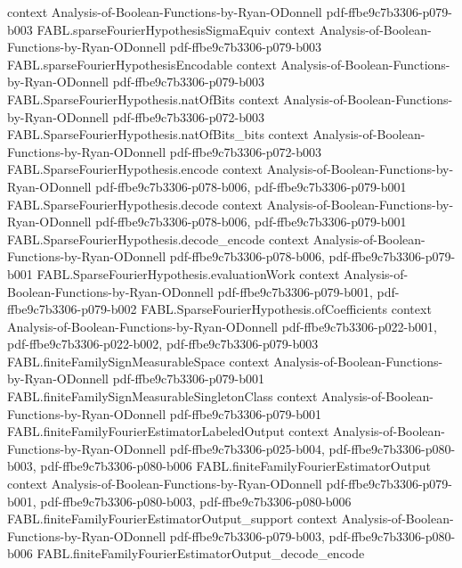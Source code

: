 \begin{theorem}
  {context}
  {Analysis-of-Boolean-Functions-by-Ryan-ODonnell}
  {pdf-ffbe9c7b3306-p079-b003}
\proofstep
  {FABL.sparseFourierHypothesisSigmaEquiv}
  {context}
  {Analysis-of-Boolean-Functions-by-Ryan-ODonnell}
  {pdf-ffbe9c7b3306-p079-b003}
\proofstep
  {FABL.sparseFourierHypothesisEncodable}
  {context}
  {Analysis-of-Boolean-Functions-by-Ryan-ODonnell}
  {pdf-ffbe9c7b3306-p079-b003}
\proofstep
  {FABL.SparseFourierHypothesis.natOfBits}
  {context}
  {Analysis-of-Boolean-Functions-by-Ryan-ODonnell}
  {pdf-ffbe9c7b3306-p072-b003}
\proofstep
  {FABL.SparseFourierHypothesis.natOfBits_bits}
  {context}
  {Analysis-of-Boolean-Functions-by-Ryan-ODonnell}
  {pdf-ffbe9c7b3306-p072-b003}
\proofstep
  {FABL.SparseFourierHypothesis.encode}
  {context}
  {Analysis-of-Boolean-Functions-by-Ryan-ODonnell}
  {pdf-ffbe9c7b3306-p078-b006,
    pdf-ffbe9c7b3306-p079-b001}
\proofstep
  {FABL.SparseFourierHypothesis.decode}
  {context}
  {Analysis-of-Boolean-Functions-by-Ryan-ODonnell}
  {pdf-ffbe9c7b3306-p078-b006,
    pdf-ffbe9c7b3306-p079-b001}
\proofstep
  {FABL.SparseFourierHypothesis.decode_encode}
  {context}
  {Analysis-of-Boolean-Functions-by-Ryan-ODonnell}
  {pdf-ffbe9c7b3306-p078-b006,
    pdf-ffbe9c7b3306-p079-b001}
\proofstep
  {FABL.SparseFourierHypothesis.evaluationWork}
  {context}
  {Analysis-of-Boolean-Functions-by-Ryan-ODonnell}
  {pdf-ffbe9c7b3306-p079-b001,
    pdf-ffbe9c7b3306-p079-b002}
\proofstep
  {FABL.SparseFourierHypothesis.ofCoefficients}
  {context}
  {Analysis-of-Boolean-Functions-by-Ryan-ODonnell}
  {pdf-ffbe9c7b3306-p022-b001,
    pdf-ffbe9c7b3306-p022-b002,
    pdf-ffbe9c7b3306-p079-b003}
\proofstep
  {FABL.finiteFamilySignMeasurableSpace}
  {context}
  {Analysis-of-Boolean-Functions-by-Ryan-ODonnell}
  {pdf-ffbe9c7b3306-p079-b001}
\proofstep
  {FABL.finiteFamilySignMeasurableSingletonClass}
  {context}
  {Analysis-of-Boolean-Functions-by-Ryan-ODonnell}
  {pdf-ffbe9c7b3306-p079-b001}
\proofstep
  {FABL.finiteFamilyFourierEstimatorLabeledOutput}
  {context}
  {Analysis-of-Boolean-Functions-by-Ryan-ODonnell}
  {pdf-ffbe9c7b3306-p025-b004,
    pdf-ffbe9c7b3306-p080-b003,
    pdf-ffbe9c7b3306-p080-b006}
\proofstep
  {FABL.finiteFamilyFourierEstimatorOutput}
  {context}
  {Analysis-of-Boolean-Functions-by-Ryan-ODonnell}
  {pdf-ffbe9c7b3306-p079-b001,
    pdf-ffbe9c7b3306-p080-b003,
    pdf-ffbe9c7b3306-p080-b006}
\proofstep
  {FABL.finiteFamilyFourierEstimatorOutput_support}
  {context}
  {Analysis-of-Boolean-Functions-by-Ryan-ODonnell}
  {pdf-ffbe9c7b3306-p079-b003,
    pdf-ffbe9c7b3306-p080-b006}
\proofstep
  {FABL.finiteFamilyFourierEstimatorOutput_decode_encode}

\end{theorem}
